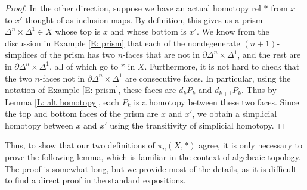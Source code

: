 \documentclass[12pt]{article}
\theoremstyle{plain}
\theoremstyle{definition}
\newcommand{\bd}{\partial}
\begin{document}
\begin{proof}
In the other direction, suppose we have an actual homotopy rel $*$ from $x$ to $x'$ thought of as inclusion maps. By definition, this gives us a prism $\Delta^n\times \Delta^1\in X$ whose top is $x$ and whose bottom is $x'$. We know from the discussion in Example \ref{E: prism} that each of the nondegenerate $(n+1)$-simplices of the prism has two $n$-faces that are not in $\bd \Delta^n\times \Delta^1$, and the rest are in $\bd \Delta^n\times \Delta^1$, all of which go to $*$ in $X$. Furthermore, it is not hard to check that the two  $n$-faces not in $\bd \Delta^n\times \Delta^1$ are consecutive faces. In particular, using the notation of Example \ref{E: prism}, these faces are $d_kP_k$ and $d_{k+1}P_k$. Thus by Lemma \ref{L: alt homotopy}, each $P_k$ is a homotopy between these two faces. Since the top and bottom faces of the prism are $x$ and $x'$, we obtain a simplicial homotopy between $x$ and $x'$ using the transitivity of simplicial homotopy.
\end{proof}

Thus, to show that our two definitions of $\pi_n(X,*)$ agree, it is only necessary to prove the following lemma, which is familiar in the context of algebraic topology. The proof is somewhat long, but we provide most of the details, as it is difficult to find a direct proof in the standard expositions.
\end{document}
